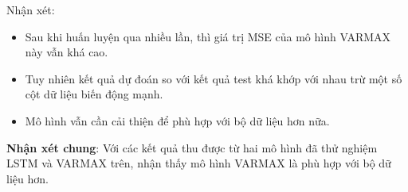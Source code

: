 Nhận xét:
\begin{itemize}
    \item Sau khi huấn luyện qua nhiều lần, thì giá trị MSE của mô hình VARMAX này vẫn khá cao.

    \item Tuy nhiên kết quả dự đoán so với kết quả test khá khớp với nhau trừ một số cột dữ liệu biến động mạnh.


    \item Mô hình vẫn cần cải thiện để phù hợp với bộ dữ liệu hơn nữa.
\end{itemize}

\noindent \textbf{Nhận xét chung}: Với các kết quả thu được từ hai mô hình đã thử nghiệm LSTM và VARMAX trên, nhận thấy mô hình VARMAX là phù hợp với bộ dữ liệu hơn.